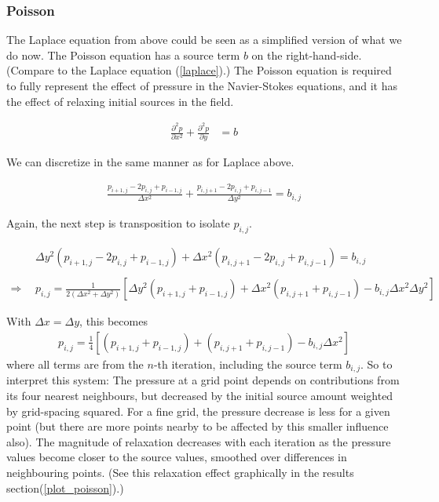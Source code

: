 \documentclass[11pt]{article}
\begin{document}
{\subsubsection{Poisson}
The Laplace equation from above could be seen as a simplified version of what we do now.
The Poisson equation has a source term $b$ on the right-hand-side.
(Compare to the Laplace equation (\ref{laplace}).)
The Poisson equation is required to fully represent the effect of pressure in
the Navier-Stokes equations, and it has the effect of relaxing initial sources in the field.

\begin{align}
\frac{\partial^2 p}{\partial x^2} + \frac{\partial^2 p}{\partial y} &= b
\label{poisson}
\end{align}

We can discretize in the same manner as for Laplace above.

\begin{align}
\frac{p_{i+1,j} - 2p_{i,j} + p_{i-1,j}}{\Delta x^2}
 + \frac{p_{i,j+1} - 2p_{i,j} + p_{i,j-1}}{\Delta y^2} = b_{i,j}
\label{discrete_poisson}
\end{align}

Again, the next step is transposition to isolate $p_{i,j}$.

\begin{align}
&\Delta y^2 (p_{i+1,j} - 2p_{i,j} + p_{i-1,j}) + \Delta x^2 (p_{i,j+1} - 2p_{i,j} + p_{i,j-1})
 = b_{i,j}
	\nonumber \\ \nonumber \\
\Rightarrow ~~&
p_{i,j} = \frac{1}{2(\Delta x^2 + \Delta y^2)}
		 \left[ \Delta y^2(p_{i+1,j} + p_{i-1,j}) + \Delta x^2(p_{i,j+1} + p_{i,j-1})
		 - b_{i,j} \Delta x^2 \Delta y^2 \right]
\end{align}

With $\Delta x = \Delta y$, this becomes
\begin{align}
p_{i,j} = \frac{1}{4}
		 \left[ (p_{i+1,j} + p_{i-1,j}) + (p_{i,j+1} + p_{i,j-1})
		 - b_{i,j} \Delta x^2 \right]
\label{transpoisson}
\end{align}
where all terms are from the $n$-th iteration, including the source term $b_{i,j}$.
So to interpret this system:
The pressure at a grid point depends on contributions from its four nearest
neighbours, but decreased by the initial source amount weighted by grid-spacing squared.
For a fine grid, the pressure decrease is less for a given point (but there are more points
nearby to be affected by this smaller influence also).
The magnitude of relaxation decreases with each iteration as the pressure values become closer
to the source values, smoothed over differences in neighbouring points.
(See this relaxation effect graphically in the results section(\ref{plot_poisson}).)


}
\end{document}
